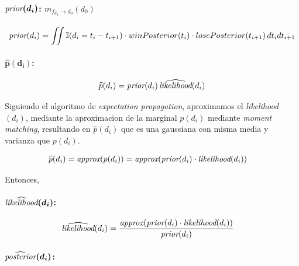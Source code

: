 \documentclass[11pt,twoside,spanish]{report} %
\begin{document}
\paragraph{$\bm{\emph{prior}(d_i)}$: $m_{f_{d_0} \rightarrow d_0}(d_0)$}

\begin{equation}
\begin{split}
\emph{prior}(d_{i}) = \iint \mathbb{I}(d_{i} = t_i - t_{i+1} ) \cdot winPosterior(t_i) \cdot losePosterior(t_{i+1}) \, dt_idt_{i+1}
\end{split}
\end{equation}


\paragraph{$\bm{\widehat{p}(d_i)}$:}

\begin{equation}
\widehat{p}(d_i) = \emph{prior}(d_i) \, \widehat{\emph{likelihood}}(d_i)
\end{equation}

Siguiendo el algoritmo de \textit{expectation propagation}, aproximamos el \emph{likelihood}$(d_i)$, mediante la aproximacion de la marginal $p(d_i)$ mediante \textit{moment matching}, resultando en $\widehat{p}(d_i)$ que es una gaussiana con misma media y varianza que $p(d_i)$.

\begin{equation}
\begin{split}
\widehat{p}(d_i) & = \emph{approx}(p(d_i)) = \emph{approx}(\emph{prior}(d_i) \cdot \emph{likelihood}(d_i))
\end{split}
\end{equation}

Entonces,
\paragraph{$\bm{\widehat{\emph{likelihood}}(d_i)}$:}

\begin{equation}
\begin{split}
\widehat{\emph{likelihood}}(d_i) &= \frac{\emph{approx}(\emph{prior}(d_i) \cdot \emph{likelihood}(d_i))}{ \emph{prior}(d_i)}
\end{split}
\end{equation}

\paragraph{$\bm{\widehat{\emph{posterior}}(d_i)}$:}
\end{document}
